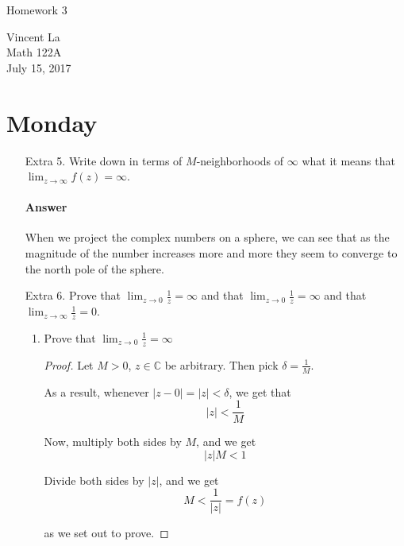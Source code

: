 \documentclass[11pt]{article}
\title{ }
\begin{document}
	\begin{center}	%
		\Large{Homework 3}	%
	\end{center}
	\begin{center}
		Vincent La \\
		Math 122A \\
		July 15, 2017
	\end{center}

\section{Monday}
\begin{enumerate}
	\item[Extra 5.] Write down in terms of $M$-neighborhoods of $\infty$ what it means that $\lim_{z \rightarrow \infty} f(z) = \infty$.
	
	\paragraph{Answer} When we project the complex numbers on a sphere, we can see that as the magnitude of the number increases more and more they seem to converge to the north pole of the sphere. 
	
	\item[Extra 6.] Prove that $\lim_{z \rightarrow 0}{\frac{1}{z}} = \infty$ and that $\lim_{z \rightarrow 0} \frac{1}{z} = \infty$ and that $\lim_{z \rightarrow \infty} \frac{1}{z} = 0$. 
	
	\begin{enumerate}
		\item Prove that $\lim_{z \rightarrow 0}{\frac{1}{z}} = \infty$
		
		\begin{proof}
			Let $M > 0$, $z \in \mathbb{C}$ be arbitrary. Then pick $\delta = \frac{1}{M}$. 
			
			As a result, whenever $|z - 0| = |z| < \delta$, we get that
			\[|z| < \frac{1}{M}\]
			
			Now, multiply both sides by $M$, and we get
			\[|z|M < 1\]
			
			Divide both sides by $|z|$, and we get
			\[M < \frac{1}{|z|} = f(z)\]
			
			as we set out to prove.		
		\end{proof}
		

\end{enumerate}
\end{enumerate}
\end{document}
